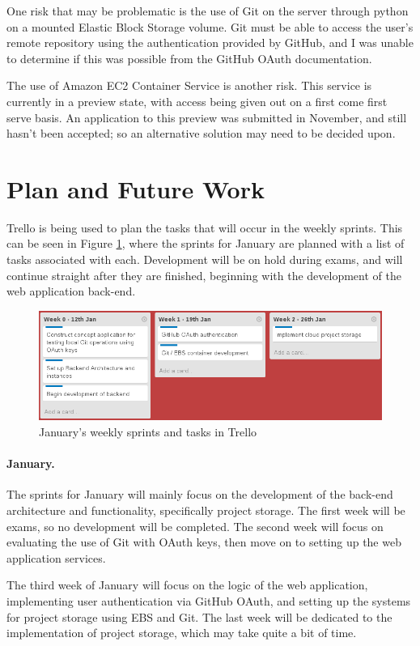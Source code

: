 \documentclass[a4paper, 12pt]{article}
\begin{document}
One risk that may be problematic is the use of Git on the server through python on a mounted Elastic Block Storage volume. Git must be able to access the user's remote repository using the authentication provided by GitHub, and I was unable to determine if this was possible from the GitHub OAuth documentation.

The use of Amazon EC2 Container Service is another risk. This service is currently in a preview state, with access being given out on a first come first serve basis. An application to this preview was submitted in November, and still hasn't been accepted; so an alternative solution may need to be decided upon.

\section{Plan and Future Work}
Trello is being used to plan the tasks that will occur in the weekly sprints. This can be seen in Figure \ref{fig:trello1}, where the sprints for January are planned with a list of tasks associated with each. Development will be on hold during exams, and will continue straight after they are finished, beginning with the development of the web application back-end.

\begin{figure}[h]
	\centering
	\includegraphics[scale=0.5]{trello1}
	\caption{January's weekly sprints and tasks in Trello}
	\label{fig:trello1}
\end{figure}

\paragraph{January.}
The sprints for January will mainly focus on the development of the back-end architecture and functionality, specifically project storage. The first week will be exams, so no development will be completed. The second week will focus on evaluating the use of Git with OAuth keys, then move on to setting up the web application services.

The third week of January will focus on the logic of the web application, implementing user authentication via GitHub OAuth, and setting up the systems for project storage using EBS and Git. The last week will be dedicated to the implementation of project storage, which may take quite a bit of time.
\end{document}
